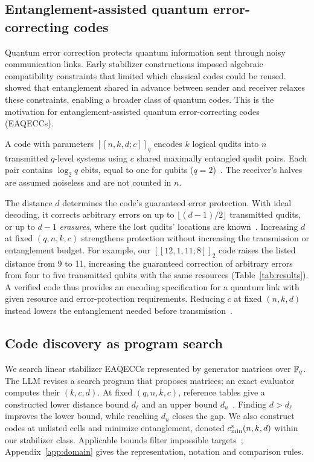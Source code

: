 \subsection{Entanglement-assisted quantum error-correcting codes}
\label{sec:ea-background}

Quantum error correction protects quantum information sent through noisy
communication links. Early stabilizer constructions imposed algebraic
compatibility constraints that limited which classical codes could be
reused. \citet{BrunDevetakHsieh2006} showed that entanglement shared in
advance between sender and receiver relaxes these constraints, enabling
a broader class of quantum codes. This is the motivation for
entanglement-assisted quantum error-correcting codes (EAQECCs).

A code with parameters $[[n,k,d;c]]_q$ encodes $k$ logical qudits into
$n$ transmitted $q$-level systems using $c$ shared maximally entangled
qudit pairs. Each pair contains $\log_2 q$ ebits, equal to one for
qubits ($q=2$)~\citep{GHW2022}. The receiver's
halves are assumed noiseless and are not counted in $n$.

The distance $d$ determines the code's guaranteed error protection.
With ideal decoding, it corrects arbitrary errors on up to
$\lfloor(d-1)/2\rfloor$ transmitted qudits, or up to $d-1$
\emph{erasures}, where the lost qudits' locations are
known~\citep{BrunDevetakHsieh2006,GHW2022}. Increasing $d$ at fixed
$(q,n,k,c)$ strengthens protection without increasing the transmission or
entanglement budget. For example, our $[[12,1,11;8]]_2$ code raises
the listed distance from 9 to 11, increasing the guaranteed correction
of arbitrary errors from four to five transmitted qubits with the same
resources (Table~\ref{tab:results}). A verified code thus provides an
encoding specification for a quantum link with given resource and
error-protection requirements. Reducing $c$ at fixed $(n,k,d)$ instead
lowers the entanglement needed before transmission~\citep{Luo2022}.

\subsection{Code discovery as program search}
\label{sec:tables-search-background}

We search linear stabilizer EAQECCs represented by generator matrices
over $\mathbb{F}_q$. The LLM revises a search program that proposes matrices;
an exact evaluator computes their $(k,c,d)$. At fixed $(q,n,k,c)$,
reference tables give a constructed lower distance bound $d_\ell$ and
an upper bound $d_u$~\citep{Codetables,Luo2022}. Finding $d>d_\ell$
improves the lower bound, while reaching $d_u$ closes the gap.
We also construct codes at unlisted cells and minimize entanglement,
denoted $c^{\mathrm{s}}_{\min}(n,k,d)$ within our stabilizer class. Applicable bounds
filter impossible targets~\citep{GHW2022}; Appendix~\ref{app:domain}
gives the representation, notation and comparison rules.

